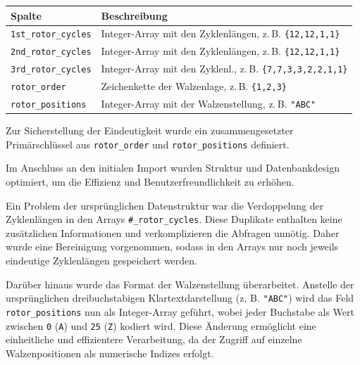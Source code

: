 \documentclass[12pt, ngerman, a4paper, numbers=noenddot]{article}
\begin{document}
\begin{center}
	\begin{tabular}{ll}
		\toprule
		\textbf{Spalte} & \textbf{Beschreibung} \\
		\midrule
		\lstinline|1st_rotor_cycles| & Integer-Array mit den Zyklenlängen, z.\,B. \lstinline|{12,12,1,1}| \\
		\lstinline|2nd_rotor_cycles| & Integer-Array mit den Zyklenlängen, z.\,B. \lstinline|{12,12,1,1}| \\
		\lstinline|3rd_rotor_cycles| & Integer-Array mit den Zyklenl., z.\,B. \lstinline|{7,7,3,3,2,2,1,1}| \\
		\lstinline|rotor_order|  & Zeichenkette der Walzenlage, z.\,B. \lstinline|{1,2,3}| \\
		\lstinline|rotor_positions|      & Integer-Array mit der Walzenstellung, z.\,B. \lstinline|"ABC"| \\
		\bottomrule
	\end{tabular}
\end{center}

Zur Sicherstellung der Eindeutigkeit wurde ein zusammengesetzter Primärschlüssel aus \lstinline|rotor_order| und \lstinline|rotor_positions| definiert. 

Im Anschluss an den initialen Import wurden Struktur und Datenbankdesign optimiert, um die Effizienz und Benutzerfreundlichkeit zu erhöhen.

Ein Problem der ursprünglichen Datenstruktur war die Verdoppelung der Zyklenlängen in den Arrays \lstinline|#_rotor_cycles|.  
Diese Duplikate enthalten keine zusätzlichen Informationen und verkomplizieren die Abfragen unnötig. Daher wurde eine Bereinigung vorgenommen, sodass in den Arrays nur noch jeweils eindeutige Zyklenlängen gespeichert werden.


Darüber hinaus wurde das Format der Walzenstellung überarbeitet. Anstelle der ursprünglichen dreibuchstabigen Klartextdarstellung (z. B. \lstinline|"ABC"|) wird das Feld \lstinline|rotor_positions| nun als Integer-Array geführt, wobei jeder Buchstabe als Wert zwischen \lstinline|0| (\lstinline|A|) und \lstinline|25| (\lstinline|Z|) kodiert wird.  
Diese Änderung ermöglicht eine einheitliche und effizientere Verarbeitung, da der Zugriff auf einzelne Walzenpositionen als numerische Indizes erfolgt.
\end{document}
